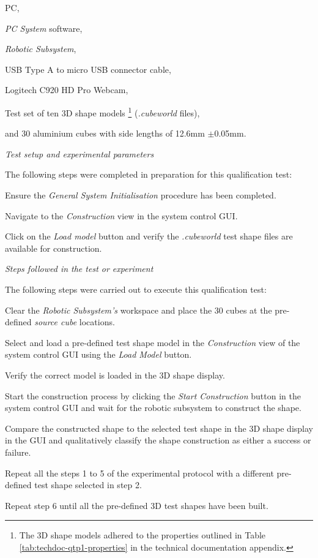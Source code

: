\begin{compactitem}
	\item PC,
	\item \textit{PC System} software,
	\item \textit{Robotic Subsystem},
	\item USB Type A to micro USB connector cable,
	\item Logitech C920 HD Pro Webcam,
	\item Test set of ten 3D shape models \footnote{The 3D shape models adhered to the properties outlined in Table \ref{tab:techdoc-qtp1-properties} in the technical documentation appendix.} (\textit{.cubeworld} files),
	\item and 30 aluminium cubes with side lengths of 12.6mm $\pm$0.05mm.
\end{compactitem}

\textit{Test setup and experimental parameters}

The following steps were completed in preparation for this qualification test:

\begin{compactenum}
	\item Ensure the \textit{General System Initialisation} procedure has been completed.
	\item Navigate to the \textit{Construction} view in the system control GUI.
	\item Click on the \textit{Load model} button and verify the \textit{.cubeworld} test shape files are available for construction.
\end{compactenum}

\textit{Steps followed in the test or experiment}

The following steps were carried out to execute this qualification test:

\begin{compactenum}
	\item Clear the \textit{Robotic Subsystem's} workspace and place the 30 cubes at the pre-defined \textit{source cube} locations.
	\item Select and load a pre-defined test shape model in the \textit{Construction} view of the system control GUI using the \textit{Load Model} button.
	\item Verify the correct model is loaded in the 3D shape display.
	\item Start the construction process by clicking the \textit{Start Construction} button in the system control GUI and wait for the robotic subsystem to construct the shape.
	\item Compare the constructed shape to the selected test shape in the 3D shape display in the GUI and qualitatively classify the shape construction as either a success or failure.
	\item Repeat all the steps 1 to 5 of the experimental protocol with a different pre-defined test shape selected in step 2. 
	\item Repeat step 6 until all the pre-defined 3D test shapes have been built.
\end{compactenum}

